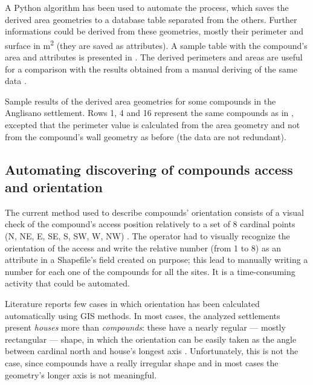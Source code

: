             A Python algorithm has been used to automate the process, which saves the derived area geometries to a database table separated from the others. Further informations could be derived from these geometries, mostly their perimeter and surface in \si{\meter\squared} (they are saved as attributes). A sample table with the compound's area and attributes is presented in . The derived perimeters and areas are useful for a comparison with the results obtained from a manual deriving of the same data %
            .

            \begin{table}
                \centering
                
                \caption[Sample results of area geometries derived from compounds and their attributes for the Anglisano settlement.]{Sample results of the derived area geometries for some compounds in the Anglisano settlement. Rows 1, 4 and 16 represent the same compounds as in , excepted that the perimeter value is calculated from the area geometry and not from the compound's wall geometry as before (the data are not redundant).}
                \label{tab:tab-area-anglisano}
            \end{table}

        \subsection{Automating discovering of compounds access and orientation}

            The current method used to describe compounds' orientation consists of a visual check of the compound's access position relatively to a set of 8 cardinal points (N, NE, E, SE, S, SW, W, NW) %
            . The operator had to visually recognize the orientation of the access and write the relative number (from 1 to 8) as an attribute in a Shapefile's field created on purpose; this lead to manually writing a number for each one of the compounds for all the sites. It is a time-consuming activity that could be automated.

            Literature reports few cases in which orientation has been calculated automatically using GIS methods. In most cases, the analyzed settlements present \emph{houses} more than \emph{compounds}: these have a nearly regular --- mostly rectangular --- shape, in which the orientation can be easily taken as the angle between cardinal north and house's longest axis \cite[p.~53]{spatial-south-europe}. Unfortunately, this is not the case, since compounds have a really irregular shape and in most cases the geometry's longer axis is not meaningful.

